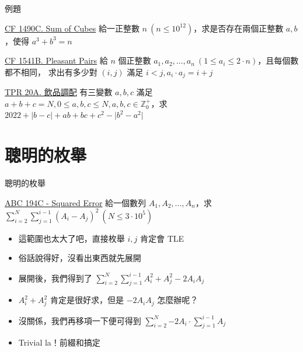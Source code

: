 \documentclass[aspectratio=169]{beamer}
\begin{document}
    \begin{frame}{例題}
        \begin{block}{\href{https://codeforces.com/problemset/problem/1490/C}{CF 1490C. Sum of Cubes}}
            給一正整數 $n\ (n \le 10^{12})$，求是否存在兩個正整數 $a, b$，使得 $a^3 + b^3 = n$
        \end{block}

        \begin{block}{\href{https://codeforces.com/problemset/problem/1541/B}{CF 1541B. Pleasant Pairs}}
            給 $n$ 個正整數 $a_1, a_2, \dots, a_n\ (1 \le a_i \le 2 \cdot n)$，且每個數都不相同，
            求出有多少對 $(i, j)$ 滿足 $i < j, a_i \cdot a_j = i + j$
        \end{block}

        \begin{block}{\href{https://codeforces.com/group/H0qY3QmnOW/contest/377732/problem/A}{TPR 20A. 飲品調配}}
            有三變數 $a, b, c$ 滿足 $a + b + c = N, 0 \le a, b, c \le N, a, b, c \in \mathbb{Z}^+_0$，求 $2022 + \lvert b - c \rvert + ab + bc + c^2 - \lvert b^2 - a^2 \rvert$
        \end{block}
    \end{frame}

    \section{聰明的枚舉}

    \begin{frame}{聰明的枚舉}
        \begin{block}{\href{https://atcoder.jp/contests/abc194/tasks/abc194_c}{ABC 194C - Squared Error}}
            給一個數列 $A_1, A_2, \dots, A_n$，求 $\displaystyle\sum_{i = 2}^{N}{\sum_{j = 1}^{i - 1}{(A_i - A_j) ^ 2}}\ (N \le 3 \cdot 10^5)$
        \end{block}

        \begin{itemize}
            \item<1-> 這範圍也太大了吧，直接枚舉 $i, j$ 肯定會 TLE
            \item<2-> 俗話說得好，沒看出東西就先展開
            \item<3-> 展開後，我們得到了 $\displaystyle\sum_{i = 2}^{N}{\sum_{j = 1}^{i - 1}{A_i ^ 2 + A_j ^ 2 - 2A_iA_j}}$
            \item<4-> $A_i ^ 2 + A_j ^ 2$ 肯定是很好求，但是 $-2A_iA_j$ 怎麼辦呢？
            \item<5-> 沒關係，我們再移項一下便可得到 $\displaystyle\sum_{i = 2}^{N}{-2A_i \cdot \sum_{j = 1}^{i - 1}{A_j}}$
            \item<6-> Trivial la！前綴和搞定
        \end{itemize}
    \end{frame}
\end{document}
